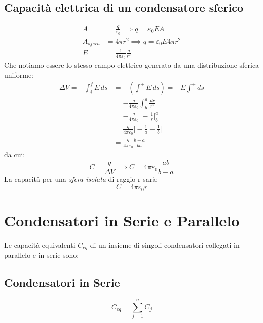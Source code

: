         \subsection{Capacità elettrica di un condensatore sferico}
            \begin{align*}
                A &= \frac{q}{\varepsilon_0} \implies q = \varepsilon_0 E A \\
                A_{sfera} &= 4\pi r^2 \implies q = \varepsilon_0E4\pi r^2 \\
                E &= \frac{1}{4\pi\varepsilon_0}\frac{q}{r^2}
            \end{align*}
        Che notiamo essere lo stesso campo elettrico generato da una 
        distribuzione sferica uniforme:
            \begin{align*}
                \Delta V = - \int_{i}^{f} E\,ds &= -(\int_{-}^{+} E\,ds)
                    = -E\int_{-}^{+}ds \\
                &= -\frac{q}{4\pi\varepsilon_0}\int_{b}^{a}\frac{dr}{r^2} \\
                &= -\frac{q}{4\pi\varepsilon_0} \Bigg[-\frac{1}{r}\Bigg]_{b}
                    ^{a} \\
                &= \frac{q}{4\pi\varepsilon_0} \Bigg[-\frac{1}{a} - \frac{1}{b}
                    \Bigg] \\
                &=  \frac{q}{4\pi\varepsilon_0} \frac{b-a}{ba}
            \end{align*}
        da cui:
            \begin{equation}
                C = \frac{q}{\Delta V} \implies C = 4\pi\varepsilon_0
                    \frac{ab}{b-a}
            \end{equation}
        La capacità per una \textit{sfera isolata} di raggio r sarà:
            \begin{equation}
                C = 4\pi\varepsilon_0r
            \end{equation}
    
    \section{Condensatori in Serie e Parallelo} Le capacità equivalenti $C_{eq}
    $ di un insieme di singoli condensatori collegati in parallelo e in serie 
    sono:

        \subsection{Condensatori in Serie}
            \begin{equation}
                C_{eq} = \sum_{j = 1}^{n} C_j
            \end{equation}

